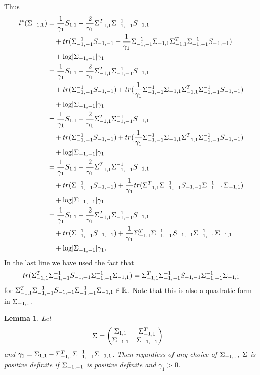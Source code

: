\documentclass[12pt, leqno]{article}
\providecommand{\abs}[1]{\lvert#1\rvert}
\def\s{\ensuremath\Sigma}
\newtheorem{lemma}{Lemma}[]
\begin{document}
Thus
\begin{align*}
l^*(\s_{-1,1}) &= \frac{1}{\gamma_1} S_{1,1} -\frac{2}{\gamma_1} \s_{-1,1}^T
  \s_{-1,-1}^{-1} S_{-1,1} \\ 
&\quad +tr(\s_{-1,-1}^{-1}S_{-1,-1} + \frac{1}{\gamma_1} \s_{-1,-1}^{-1}
\s_{-1,1} \s_{-1,1}^T \s_{-1,-1}^{-1} S_{-1,-1} ) \\ 
&\quad + \log \abs{\s_{-1,-1}}
  \gamma_1 \\
&= \frac{1}{\gamma_1} S_{1,1} -\frac{2}{\gamma_1} \s_{-1,1}^T
  \s_{-1,-1}^{-1} S_{-1,1} \\ 
&\quad +tr(\s_{-1,-1}^{-1}S_{-1,-1}) + tr(\frac{1}{\gamma_1} \s_{-1,-1}^{-1}
\s_{-1,1} \s_{-1,1}^T \s_{-1,-1}^{-1} S_{-1,-1} ) \\ 
& \quad+ \log \abs{\s_{-1,-1}}
  \gamma_1 \\
&= \frac{1}{\gamma_1} S_{1,1} -\frac{2}{\gamma_1} \s_{-1,1}^T
  \s_{-1,-1}^{-1} S_{-1,1} \\ 
&\quad +tr(\s_{-1,-1}^{-1}S_{-1,-1}) + tr(\frac{1}{\gamma_1} \s_{-1,-1}^{-1}
\s_{-1,1} \s_{-1,1}^T \s_{-1,-1}^{-1} S_{-1,-1} ) \\ 
&\quad + \log \abs{\s_{-1,-1}}
  \gamma_1 \\
 &=\frac{1}{\gamma_1} S_{1,1} -\frac{2}{\gamma_1} \s_{-1,1}^T
  \s_{-1,-1}^{-1} S_{-1,1} \\ 
&\quad +tr(\s_{-1,-1}^{-1}S_{-1,-1})
                                +\frac{1}{\gamma_1} 
tr(\s_{-1,1}^T \s_{-1,-1}^{-1} S_{-1,-1} \s_{-1,-1}^{-1}
\s_{-1,1}) \\ 
&\quad + \log \abs{\s_{-1,-1}}
  \gamma_1 \\
 &=\frac{1}{\gamma_1} S_{1,1} -\frac{2}{\gamma_1} \s_{-1,1}^T
  \s_{-1,-1}^{-1} S_{-1,1} \\ 
&\quad +tr(\s_{-1,-1}^{-1}S_{-1,-1})
                                +\frac{1}{\gamma_1} 
\s_{-1,1}^T \s_{-1,-1}^{-1} S_{-1,-1} \s_{-1,-1}^{-1}
\s_{-1,1} \\ 
&\quad + \log \abs{\s_{-1,-1}}
  \gamma_1. 
\end{align*}
In the last line we have used the fact that 
\[
tr(\s_{-1,1}^T \s_{-1,-1}^{-1} S_{-1,-1} \s_{-1,-1}^{-1}
\s_{-1,1}) = \s_{-1,1}^T \s_{-1,-1}^{-1} S_{-1,-1} \s_{-1,-1}^{-1}
\s_{-1,1}
\]
for $\s_{-1,1}^T \s_{-1,-1}^{-1} S_{-1,-1} \s_{-1,-1}^{-1}
\s_{-1,1} \in \mathbb{R}$. Note that this is also a quadratic form in
$\s_{-1,1}$. 
\begin{lemma}
Let 
\begin{align*}
\s &= \begin{pmatrix} \s_{1,1} & \s_{-1,1}^T \\
\s_{-1,1} & \s_{-1,-1} \\
\end{pmatrix}
\end{align*}
and $\gamma_1 = \s_{1,1} - \s_{-1,1}^T \s_{-1,-1}^{-1}
\s_{-1,1}$. Then regardless of any choice of $\s_{-1,1}$, $\s$ is
positive definite  if $\s_{-1,-1}$ is positive definite and $\gamma_1>0$.
\end{lemma}
\end{document}
